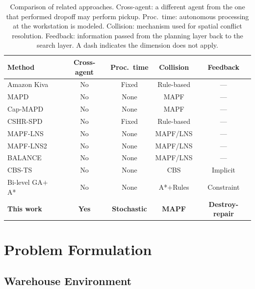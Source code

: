 \documentclass{article}
\begin{document}
\begin{table}[H]
\centering
\caption{Comparison of related approaches. Cross-agent: a different agent
from the one that performed dropoff may perform pickup. Proc.\ time:
autonomous processing at the workstation is modeled. Collision: mechanism
used for spatial conflict resolution. Feedback: information passed from the
planning layer back to the search layer. A dash indicates the dimension does
not apply.}
\label{tab:comparison}
\small
\begin{tabular}{lcccc}
\toprule
Method & Cross-agent & Proc.\ time & Collision & Feedback \\
\midrule
Amazon Kiva~\cite{kiva_patent_2014}
    & No & Fixed      & Rule-based  & ---         \\
MAPD~\cite{ma2017lifelong}
    & No & None       & MAPF        & ---         \\
Cap-MAPD~\cite{li2021capapd}
    & No & None       & MAPF        & ---         \\
CSHR-SPD~\cite{cshr_spd_2025}
    & No & Fixed      & Rule-based  & ---         \\
MAPF-LNS~\cite{mapf_lns_2021}
    & No & None       & MAPF/LNS   & ---         \\
MAPF-LNS2~\cite{mapf_lns2_2022}
    & No & None       & MAPF/LNS   & ---         \\
BALANCE~\cite{balance_2024}
    & No & None       & MAPF/LNS   & ---         \\
CBS-TS~\cite{cbsts_2025}
    & No & None       & CBS         & Implicit    \\
Bi-level GA$+$A*~\cite{bilevel_ga_astar_2025}
    & No & None       & A*$+$Rules  & Constraint  \\
\midrule
\textbf{This work}
    & \textbf{Yes} & \textbf{Stochastic} & \textbf{MAPF} & \textbf{Destroy-repair} \\
\bottomrule
\end{tabular}
\end{table}

\section{Problem Formulation}
\label{sec:problem}

\subsection{Warehouse Environment}
\end{document}
